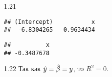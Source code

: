 \begin{solution}{{1.21}}
\begin{knitrout}
\begin{kframe}
\begin{alltt}
  \hlstd{=} \hlstd{,}  \hlstd{=} \hlstd{,}
      \hlstd{=} \hlstd{,}  \hlstd{=} \hlstd{(}\hlstd{,}\hlstd{),}  \hlstd{=} \hlstd{(}\hlopt{-}\hlstd{,}\hlstd{))}
\hlstd{(}\hlstd{(} \hlopt{~} \hlstd{x))[}\hlstd{],} \hlstd{(} \hlopt{~} \hlstd{x))[}\hlstd{],}  \hlstd{=} \hlstd{)}
\hlstd{(}\hlstd{,} \hlstd{(} \hlopt{~}  \hlopt{+} \hlstd{x))[}\hlstd{] ,}  \hlstd{=} \hlstd{)}
 \hlkwb{<-} \hlstd{(}\hlstd{,} \hlstd{)}
\hlstd{(}\hlstd{(}\hlstd{,} \hlstd{),} \hlstd{(}\hlstd{,} 
\hlstd{(} \hlopt{~} 
\end{alltt}
\begin{verbatim}
## (Intercept)           x
##  -6.8304265   0.9634434
\end{verbatim}
\begin{alltt}
\hlstd{(} \hlopt{~}  \hlopt{+} 
\end{alltt}
\begin{verbatim}
##          x
## -0.3487678
\end{verbatim}
\begin{alltt}
\hlstd{(}\hlstd{())}
\end{alltt}
\end{kframe}
\end{knitrout}

\begin{minipage}{0.6\textwidth}
\begin{center}
\begin{tikzpicture}[scale = 0.025]

\end{tikzpicture}
\end{center}
\end{minipage}
\end{solution}
\protect \hypertarget {soln:1.22}{}
\begin{solution}{{1.22}}
Так как \(\hy = \hb = \bar{y} \), то \(R^2 = 0\).
\end{solution}
